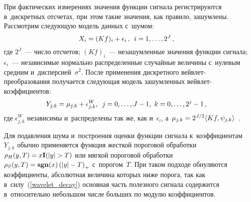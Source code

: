 \begin{multicols}{2}
При фактических измерениях значения функции сигнала регистрируются 
в~дискретных отсчетах, при этом такие значения, как правило, зашумлены. 
Рассмотрим сле\-ду\-ющую модель данных \mbox{с~шумом}:
\begin{equation*}
X_i = (Kf)_i + \epsilon_i\,, \enskip i = 1, \dots, 2^J\,, %
\end{equation*}
где $2^J$~--- число отсчетов; $(Kf)_i$~--- незашумленные значения функции сигнала; 
$\epsilon_i$~--- независимые нормально распределенные случайные величины с~нулевым 
средним и~дисперсией~$\sigma^2$.
После применения дискретного вейв\-лет-пре\-об\-ра\-зо\-ва\-ния 
получается следующая модель зашумленных вейв\-лет-ко\-эф\-фи\-ци\-ен\-тов:
\begin{equation*}
Y_{j,k}=\mu_{j,k}+\epsilon^W_{j,k},\enskip 
j=0,\ldots,J-1,\ k=0,\ldots,2^{j}-1\,,
\end{equation*}
где $\epsilon^W_{j,k}$ независимы и~распределены так же, как и~$\epsilon_i$, 
а~$\mu_{j,k}\hm= 2^{J/2}\langle Kf,\psi_{j,k}\rangle$~\cite{Mal99}.

Для подавления шума и~построения оценки функции сигнала к~коэффициентам~$Y_{j,k}$ 
обычно применяется функция жесткой пороговой обработки 
$\rho_{H}(y,T)\hm=x\textbf{I}(\abs{y}>T)$ или мягкой пороговой 
обработки $\rho_{S}(y,T)\hm=\textbf{sgn}(x)\left(\abs{y}-T\right)_{+}$ 
с~порогом~$T$. При таком подходе обнуляются коэффициенты, абсолютная величина 
которых ниже порога, так как в~силу~(\ref{wavelet_decay}) основная часть
 полезного сигнала содержится в~относительно небольшом числе больших по 
 модулю коэффициентов.


\end{multicols}
